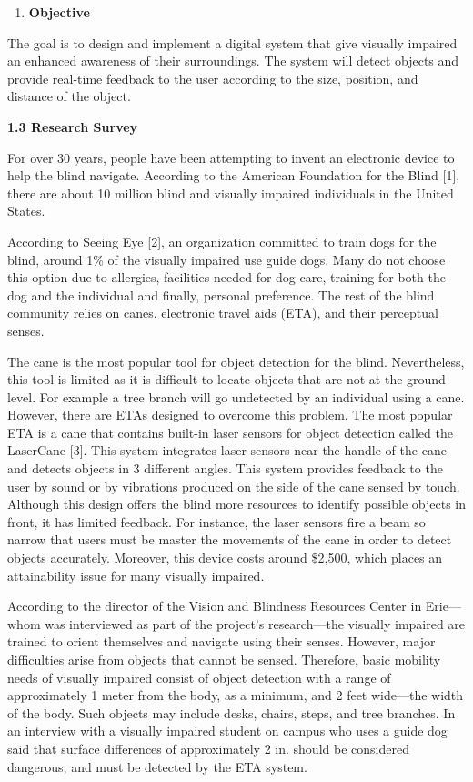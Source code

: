 \begin{enumerate}
\def\labelenumi{\arabic{enumi}.}
\item
  \textbf{Objective}
\end{enumerate}

The goal is to design and implement a digital system that give visually
impaired an enhanced awareness of their surroundings. The system will
detect objects and provide real-time feedback to the user according to
the size, position, and distance of the object.

\textbf{1.3 Research Survey}

For over 30 years, people have been attempting to invent an electronic
device to help the blind navigate. According to the American Foundation
for the Blind {[}1{]}, there are about 10 million blind and visually
impaired individuals in the United States.

According to Seeing Eye {[}2{]}, an organization committed to train dogs
for the blind, around 1\% of the visually impaired use guide dogs. Many
do not choose this option due to allergies, facilities needed for dog
care, training for both the dog and the individual and finally, personal
preference. The rest of the blind community relies on canes, electronic
travel aids (ETA), and their perceptual senses.

The cane is the most popular tool for object detection for the blind.
Nevertheless, this tool is limited as it is difficult to locate objects
that are not at the ground level. For example a tree branch will go
undetected by an individual using a cane. However, there are ETAs
designed to overcome this problem. The most popular ETA is a cane that
contains built-in laser sensors for object detection called the
LaserCane {[}3{]}. This system integrates laser sensors near the handle
of the cane and detects objects in 3 different angles. This system
provides feedback to the user by sound or by vibrations produced on the
side of the cane sensed by touch. Although this design offers the blind
more resources to identify possible objects in front, it has limited
feedback. For instance, the laser sensors fire a beam so narrow that
users must be master the movements of the cane in order to detect
objects accurately. Moreover, this device costs around \$2,500, which
places an attainability issue for many visually impaired.

According to the director of the Vision and Blindness Resources Center
in Erie---whom was interviewed as part of the project's research---the
visually impaired are trained to orient themselves and navigate using
their senses. However, major difficulties arise from objects that cannot
be sensed. Therefore, basic mobility needs of visually impaired consist
of object detection with a range of approximately 1 meter from the body,
as a minimum, and 2 feet wide---the width of the body. Such objects may
include desks, chairs, steps, and tree branches. In an interview with a
visually impaired student on campus who uses a guide dog said that
surface differences of approximately 2 in. should be considered
dangerous, and must be detected by the ETA system.

